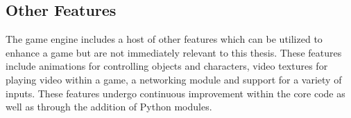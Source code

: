\subsection{Other Features}

The game engine includes a host of other features which can be utilized to
enhance a game but are not immediately relevant to this thesis. These features
include animations for controlling objects and characters, video textures for
playing video within a game, a networking module and support for a variety of
inputs. These features undergo continuous improvement within the core code as
well as through the addition of Python modules. 





